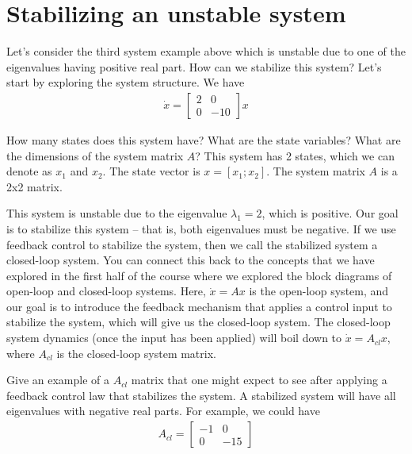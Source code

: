 \documentclass{ee122_notes}
\begin{document}
\section{Stabilizing an unstable system}
Let's consider the third system example above which is unstable due to one of the eigenvalues having positive real part. How can we stabilize this system? Let's start by exploring the system structure. We have
\begin{align*}
\dot{x} = \begin{bmatrix}
2 & 0\\
0 & -10
\end{bmatrix}x
\end{align*}
\begin{popquiz}
How many states does this system have? What are the state variables? What are the dimensions of the system matrix $A$?
\popqsplit
This system has 2 states, which we can denote as $x_1$ and $x_2$. The state vector is $x = [x_1; x_2]$. The system matrix $A$ is a 2x2 matrix.
\end{popquiz}
This system is unstable due to the eigenvalue $\lambda_1 = 2$, which is positive. Our goal is to stabilize this system -- that is, both eigenvalues must be negative. If we use feedback control to stabilize the system, then we call the stabilized system a closed-loop system. You can connect this back to the concepts that we have explored in the first half of the course where we explored the block diagrams of open-loop and closed-loop systems. Here, $\dot x = Ax$ is the open-loop system, and our goal is to introduce the feedback mechanism that applies a control input to stabilize the system, which will give us the closed-loop system. The closed-loop system dynamics (once the input has been applied) will boil down to $\dot x = A_{cl}x$, where $A_{cl}$ is the closed-loop system matrix. 
\begin{popquiz}
    Give an example of a $A_{cl}$ matrix that one might expect to see after applying a feedback control law that stabilizes the system. 
    \popqsplit
    A stabilized system will have all eigenvalues with negative real parts. For example, we could have
\begin{align*}
A_{cl} = \begin{bmatrix}
-1 & 0\\
0 & -15
\end{bmatrix}
\end{align*}
\end{popquiz}
\end{document}
